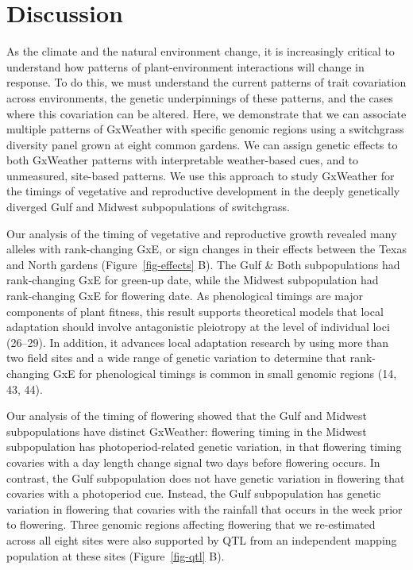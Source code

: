 \documentclass[
  9pt,
  twocolumn,
  twoside]{pnas-new}
\begin{document}
\section{Discussion}\label{discussion}

As the climate and the natural environment change, it is increasingly
critical to understand how patterns of plant-environment interactions
will change in response. To do this, we must understand the current
patterns of trait covariation across environments, the genetic
underpinnings of these patterns, and the cases where this covariation
can be altered. Here, we demonstrate that we can associate multiple
patterns of GxWeather with specific genomic regions using a switchgrass
diversity panel grown at eight common gardens. We can assign genetic
effects to both GxWeather patterns with interpretable weather-based
cues, and to unmeasured, site-based patterns. We use this approach to
study GxWeather for the timings of vegetative and reproductive
development in the deeply genetically diverged Gulf and Midwest
subpopulations of switchgrass.

Our analysis of the timing of vegetative and reproductive growth
revealed many alleles with rank-changing GxE, or sign changes in their
effects between the Texas and North gardens (Figure~\ref{fig-effects}
B). The Gulf \& Both subpopulations had rank-changing GxE for green-up
date, while the Midwest subpopulation had rank-changing GxE for
flowering date. As phenological timings are major components of plant
fitness, this result supports theoretical models that local adaptation
should involve antagonistic pleiotropy at the level of individual loci
(26--29). In addition, it advances local adaptation research by using
more than two field sites and a wide range of genetic variation to
determine that rank-changing GxE for phenological timings is common in
small genomic regions (14, 43, 44).

Our analysis of the timing of flowering showed that the Gulf and Midwest
subpopulations have distinct GxWeather: flowering timing in the Midwest
subpopulation has photoperiod-related genetic variation, in that
flowering timing covaries with a day length change signal two days
before flowering occurs. In contrast, the Gulf subpopulation does not
have genetic variation in flowering that covaries with a photoperiod
cue. Instead, the Gulf subpopulation has genetic variation in flowering
that covaries with the rainfall that occurs in the week prior to
flowering. Three genomic regions affecting flowering that we
re-estimated across all eight sites were also supported by QTL from an
independent mapping population at these sites (Figure~\ref{fig-qtl} B).
\end{document}
